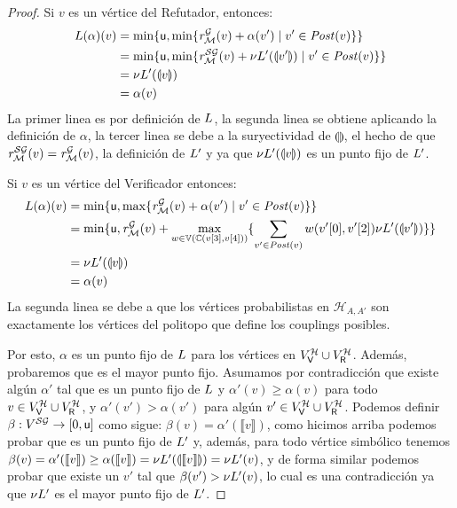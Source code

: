 \begin{proof}
   Si $v$ es un vértice del Refutador,  entonces:
\begin{align}
   \Bellman(\alpha)(v) & =  \min \{\upperbound,  \min \{\mreward^\StochG(v)  + \alpha(v') \mid v' \in \post(v) \} \}  \\
                                    & =  \min \{\upperbound,  \min \{\mreward^\SymbG(v)  +\nu \Bellman'(\llparenthesis v'  \rrparenthesis) \mid v' \in \post(v) \} \} \\  
                                    & = \nu \Bellman'(\llparenthesis v  \rrparenthesis) \\
                                    & = \alpha(v)           
\end{align}
 La primer linea es por definición de $\Bellman$, la segunda linea se obtiene aplicando la definición de $\alpha$, la tercer linea se debe a la suryectividad de  $\llparenthesis \rrparenthesis$,  el hecho de que $\mreward^\SymbG(v) = \mreward^\StochG(v) $, la definición de $\Bellman'$ y ya que $\nu \Bellman'(\llparenthesis v  \rrparenthesis)$ es un punto fijo de $\Bellman'$.

    Si $v$ es un vértice del Verificador entonces:
\begin{align}
   \Bellman(\alpha)(v) & =   \min \{ \upperbound, \max \{\mreward^\StochG(v) + \alpha(v') \mid v' \in \post(v) \} \}  \\
                                    & =   \min \{ \upperbound, \mreward^\StochG(v) + \max_{w \in \vertices{\couplings{\pr{3}{v}}{\pr{4}{v}}}} \{\sum_{v' \in \post(v)} w(\pr{0}{v'},\pr{2}{v'})  \nu \Bellman'(\llparenthesis v' \rrparenthesis) \} \} \\  
                                    & = \nu \Bellman'(\llparenthesis v  \rrparenthesis) \\
                                    & = \alpha(v)           
\end{align}
    La segunda linea se debe a que los vértices probabilistas en $\mathcal{H}_{A,A'}$ son exactamente los vértices del politopo que define los couplings posibles.

    Por esto, $\alpha$ es un punto fijo de $\Bellman$ para los vértices en $V^{\mathcal{H}}_\Verifier \cup V^{\mathcal{H}}_\Refuter$.  Además,  probaremos que es el mayor punto fijo. Asumamos por contradicción que existe algún $\alpha'$ tal que es un punto fijo de $\Bellman$ y $\alpha'(v) \geq  \alpha(v)$ para todo $v \in V^{\mathcal{H}}_\Verifier \cup V^{\mathcal{H}}_\Refuter$, y $\alpha'(v') >  \alpha(v')$ para algún $v' \in V^{\mathcal{H}}_\Verifier \cup V^{\mathcal{H}}_\Refuter$.  
    Podemos definir $\beta : V^{\SymbG} \rightarrow [0,\upperbound]$ como sigue: $\beta(v) = \alpha'(\llbracket v \rrbracket)$, como hicimos arriba podemos probar que es un punto fijo de $\Bellman'$ y, además, para todo vértice simbólico tenemos $\beta(v) =  \alpha'(\llbracket v \rrbracket) \geq \alpha(\llbracket v \rrbracket) = \nu \Bellman'(\llparenthesis \llbracket v \rrbracket \rrparenthesis)
    = \nu \Bellman'(v)$, y de forma similar podemos probar que existe un $v'$ tal que $\beta(v') >  \nu \Bellman'(v)$, lo cual es una contradicción ya que $\nu \Bellman'$ es el mayor punto fijo de $\Bellman'$.
\end{proof}\\
